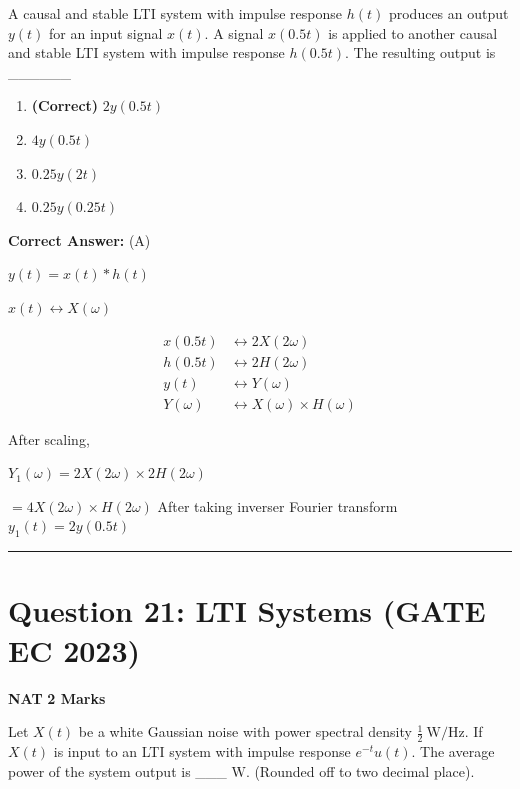 \documentclass[11pt,a4paper]{article}
\begin{document}
\noindent A causal and stable LTI system with impulse response $h(t)$ produces an output $y(t)$ for an input signal $x(t)$. A signal $x(0.5 t)$ is applied to another causal and stable LTI system with impulse response $h(0.5 t)$. The resulting output is \_\_\_\_\_\_


\begin{enumerate}[label=(\Alph*)]
    \item \textbf{(Correct)} $2 y(0.5 t)$
    \item $4 y(0.5 t)$
    \item $0.25 y(2 t)$
    \item $0.25 y(0.25 t)$
\end{enumerate}

\noindent \textbf{Correct Answer:} (A)

\begin{tcolorbox}[solbox, title=Detailed Solution -- Question 20]
$y(t)=x(t) * h(t)$

$x(t) \leftrightarrow X(\omega)$

 
\[
\begin{aligned}
x(0.5 t) & \leftrightarrow 2 X(2 \omega) \\
h(0.5 t) & \leftrightarrow 2 H(2 \omega) \\
y(t) & \leftrightarrow Y(\omega) \\
Y(\omega) & \leftrightarrow X(\omega) \times H(\omega)
\end{aligned}
\]

After scaling,

 $Y_{1}(\omega)=2 X(2 \omega) \times 2 H(2 \omega)$

 $=4 X(2 \omega) \times H(2 \omega)$
After taking inverser Fourier transform
 $y_{1}(t)=2 y(0.5 t)$
\end{tcolorbox}

\vspace{1.5em}
\hrule
\vspace{1.5em}

\section*{Question 21: LTI Systems (GATE EC 2023)}
\noindent \textbf{\color{primary}NAT} \hfill \textbf{\color{secondary}2 Marks}


\noindent Let $X(t)$ be a white Gaussian noise with power spectral density $\frac{1}{2} \mathrm{~W} / \mathrm{Hz}$. If $X(t)$ is input to an LTI system with impulse response $e^{-t} u(t)$. The average power of the system output is \_\_\_ $\mathrm{W}$. (Rounded off to two decimal place).
\end{document}
